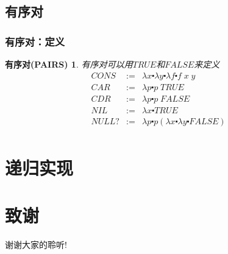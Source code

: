 \documentclass[CJKutf8,compress,hyperref]{beamer}
\begin{document}
\begin{CJK}{UTF8}{song}
\subsection{有序对}
\begin{frame}
  \frametitle{有序对：定义} 
\newtheorem{pairs}{有序对(PAIRS)}
\begin{pairs}
  有序对可以用$TRUE$和$FALSE$来定义　
  \begin{eqnarray*}
    CONS & := & \lambda x \centerdot \lambda y \centerdot \lambda f \centerdot f \; x \; y \\ 
    CAR & := & \lambda p \centerdot p \; TRUE \\
    CDR & := & \lambda p \centerdot p \; FALSE \\ 
    NIL & := & \lambda x \centerdot TRUE \\
    NULL? & := & \lambda p \centerdot p(\lambda x \centerdot \lambda y \centerdot FALSE) \\
  \end{eqnarray*}
\end{pairs}

\end{frame}

\section{递归实现} 

\section{致谢}
\begin{frame}
  \begin{Huge}
    \begin{center}
      谢谢大家的聆听!
    \end{center}
  \end{Huge}
\end{frame}
\end{CJK}
\end{document}
